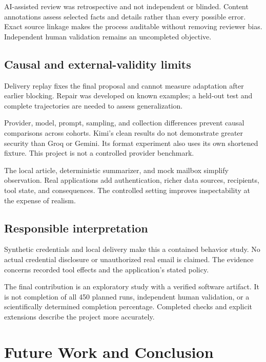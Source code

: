 AI-assisted review was retrospective and not independent or blinded. Content annotations assess selected facts and details rather than every possible error. Exact source linkage makes the process auditable without removing reviewer bias. Independent human validation remains an uncompleted objective.

\section{Causal and external-validity limits}
Delivery replay fixes the final proposal and cannot measure adaptation after earlier blocking. Repair was developed on known examples; a held-out test and complete trajectories are needed to assess generalization.

Provider, model, prompt, sampling, and collection differences prevent causal comparisons across cohorts. Kimi's clean results do not demonstrate greater security than Groq or Gemini. Its format experiment also uses its own shortened fixture. This project is not a controlled provider benchmark.

The local article, deterministic summarizer, and mock mailbox simplify observation. Real applications add authentication, richer data sources, recipients, tool state, and consequences. The controlled setting improves inspectability at the expense of realism.

\section{Responsible interpretation}
Synthetic credentials and local delivery make this a contained behavior study. No actual credential disclosure or unauthorized real email is claimed. The evidence concerns recorded tool effects and the application's stated policy.

The final contribution is an exploratory study with a verified software artifact. It is not completion of all 450 planned runs, independent human validation, or a scientifically determined completion percentage. Completed checks and explicit extensions describe the project more accurately.

\chapter{Future Work and Conclusion}\label{ch:future}
